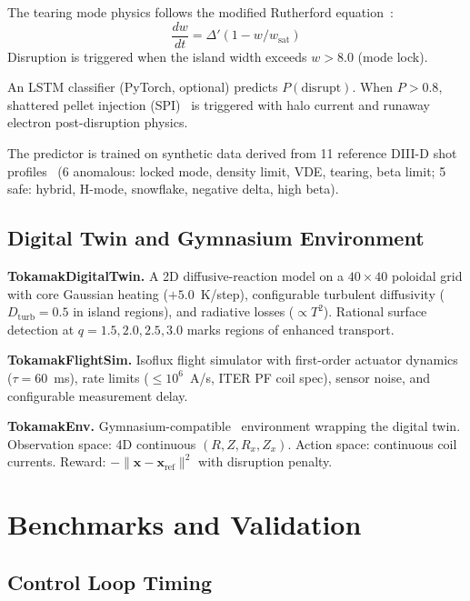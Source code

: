 \documentclass[twocolumn,preprintnumbers,amsmath,amssymb,prl,floatfix]{revtex4-2}
\begin{document}
The tearing mode physics follows the modified Rutherford
equation~\cite{devries2011}:
%
\begin{equation}
  \frac{dw}{dt} = \Delta'(1 - w/w_\mathrm{sat})
\end{equation}
%
Disruption is triggered when the island width exceeds
$w > 8.0$ (mode lock).

An LSTM classifier (PyTorch, optional) predicts $P(\mathrm{disrupt})$.
When $P > 0.8$, shattered pellet injection
(SPI)~\cite{lehnen2015} is triggered with halo current and
runaway electron post-disruption physics.

The predictor is trained on synthetic data derived from 11
reference DIII-D shot profiles~\cite{rea2019}
(6 anomalous: locked mode, density limit, VDE, tearing, beta
limit; 5 safe: hybrid, H-mode, snowflake, negative delta,
high beta).

\subsection{Digital Twin and Gymnasium Environment}

\textbf{TokamakDigitalTwin.}\quad
A 2D diffusive-reaction model on a $40 \times 40$ poloidal grid
with core Gaussian heating ($+5.0$~K/step), configurable
turbulent diffusivity ($D_\mathrm{turb} = 0.5$ in island
regions), and radiative losses ($\propto T^2$).
Rational surface detection at $q = 1.5, 2.0, 2.5, 3.0$ marks
regions of enhanced transport.

\textbf{TokamakFlightSim.}\quad
Isoflux flight simulator with first-order actuator dynamics
($\tau = 60$~ms), rate limits
($\leq 10^6$~A/s, ITER PF coil spec), sensor noise, and
configurable measurement delay.

\textbf{TokamakEnv.}\quad
Gymnasium-compatible~\cite{gymnasium2023} environment wrapping
the digital twin.  Observation space: 4D continuous
$(R, Z, R_x, Z_x)$.  Action space: continuous coil currents.
Reward: $-\|\mathbf{x} - \mathbf{x}_\mathrm{ref}\|^2$
with disruption penalty.


\section{Benchmarks and Validation}
\label{sec:validation}

\subsection{Control Loop Timing}
\end{document}
